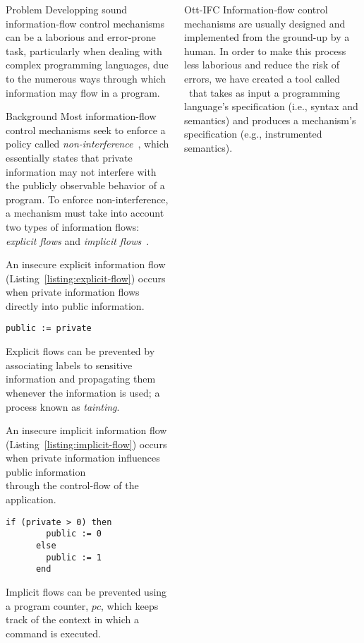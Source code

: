 \documentclass[final]{beamer}
\newlength{\onecolwid}
\begin{document}
\begin{frame}[fragile]
\begin{columns}[t]
\begin{column}{\onecolwid}
\begin{alertblock}{Problem}
    Developping sound information-flow control mechanisms can be a laborious and error-prone task, particularly when dealing with complex programming languages, due to the numerous ways through which information may flow in a program.
\end{alertblock}

\begin{block}{Background}
    Most information-flow control mechanisms seek to enforce a policy called \emph{non-interference}~\cite{DBLP:conf/sp/GoguenM82a}, which essentially states that private information may not interfere with the publicly observable behavior of a program. To enforce non-interference, a mechanism must take into account two types of information flows: \emph{explicit flows} and \emph{implicit flows}~\cite{DBLP:journals/cacm/Denning76}. 
    
    An insecure explicit information flow (Listing~\ref{listing:explicit-flow}) occurs when private information flows directly into public information. 
    \begin{lstlisting}[captionpos=b, caption=Insecure explicit flow, label=listing:explicit-flow]
      public := private
    \end{lstlisting}
    Explicit flows can be prevented by associating labels to sensitive information and propagating them whenever the information is used; a process known as \emph{tainting}.
    
    An insecure implicit information flow (Listing~\ref{listing:implicit-flow}) occurs when private information influences public information\\through the control-flow of the application.
    \pagebreak
    \begin{lstlisting}[captionpos=b, caption=Insecure implicit flow, label=listing:implicit-flow]
      if (private > 0) then
        public := 0
      else
        public := 1
      end
    \end{lstlisting}
    Implicit flows can be prevented using a program counter, $pc$, which keeps track of the context in which a command is executed.
\end{block}

\end{column}
\begin{column}{\onecolwid}

\begin{block}{Ott-IFC}
    Information-flow control mechanisms are usually designed and implemented from the ground-up by a human. In order to make this process less laborious and reduce the risk of errors, we have created a tool called \ottifc\ that takes as input a programming language's specification (i.e., syntax and semantics) and produces a mechanism's specification (e.g., instrumented semantics). 
    

\end{block}
\end{column}
\end{columns}
\end{frame}
\end{document}
